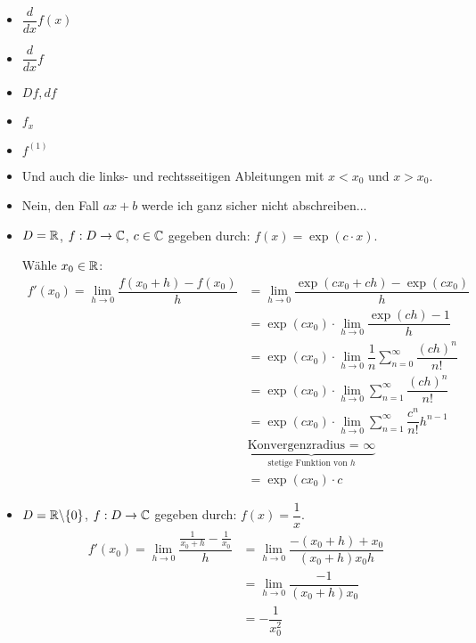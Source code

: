 \documentclass[main.tex]{subfiles}
\begin{document}
\begin{Bemerkung}
  \begin{itemize}
    \item $\dfrac{d}{dx}f(x)$
    \item $\dfrac{d}{d x} f$
    \item $D f, df$
    \item $f_x$
    \item $f^{(1)}$
    \item Und auch die links- und rechtsseitigen Ableitungen mit $x < x_0$ und $x > x_0$.
  \end{itemize}
\end{Bemerkung}

\begin{Beispiel}
  \begin{itemize}
    \item Nein, den Fall $ax + b$ werde ich ganz sicher nicht abschreiben...
    \item $D = \mathbb{R}$, $f: D \to \mathbb{C}$, $c \in \mathbb{C}$ gegeben durch: $f(x) = \exp(c \cdot x)$.

      Wähle $x_0 \in \mathbb{R}$:
      $$\begin{aligned}
        f'(x_0) = \lim \limits_{h\to0} \dfrac{f(x_0+h)-f(x_0)}{h}
        &= \lim \limits_{h\to 0} \dfrac{\exp(cx_0 + ch)-\exp(cx_0)}{h} \\
        &= \exp(c x_0) \cdot \lim \limits_{h \to 0} \dfrac{\exp(ch)-1}{h} \\
        &= \exp(c x_0) \cdot \lim \limits_{h \to 0} \dfrac{1}{n}\sum \limits_{n=0}^\infty \dfrac{(ch)^n}{n!} \\
        &= \exp(c x_0) \cdot \lim \limits_{h \to 0} \sum \limits_{n=1}^\infty \dfrac{(ch)^n}{n!} \\
        &= \exp(c x_0) \cdot \lim \limits_{h \to 0} \sum \limits_{n=1}^\infty \dfrac{c^n}{n!}h^{n-1} \\
        & \underbrace{\text{Konvergenzradius = }\infty}_{\text{stetige Funktion von }h} \\
        &= \exp(c x_0) \cdot c
      \end{aligned}$$
    \item $D = \mathbb{R} \backslash\{0\}$, $f: D \to \mathbb{C}$ gegeben durch: $f(x) = \dfrac{1}{x}$.
      $$\begin{aligned}
        f'(x_0) = \lim \limits_{h\to0} \dfrac{\frac{1}{x_0+h}-\frac{1}{x_0}}{h} &= \lim \limits_{h\to 0} \dfrac{-(x_0 + h)+x_0}{(x_0 +h) x_0 h}\\
        &= \lim \limits_{h\to0} \dfrac{-1}{(x_0+h)x_0}\\
        &= -\dfrac{1}{x_0^2}
      \end{aligned}$$
  \end{itemize}
\end{Beispiel}
\end{document}
